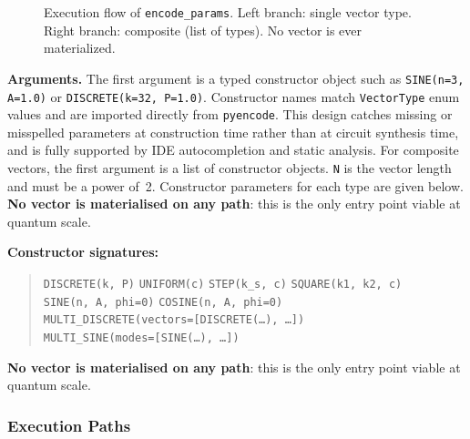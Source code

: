 \documentclass[10pt,twocolumn]{article}
\begin{document}
\begin{figure}[ht]
\caption{Execution flow of \texttt{encode\_params}.
         Left branch: single vector type.
         Right branch: composite (list of types).
         No vector is ever materialized.}
\label{fig:encode_params_flow}
\end{figure}

\noindent\textbf{Arguments.}
The first argument is a typed constructor object such
as \texttt{SINE(n=3, A=1.0)} or
\texttt{DISCRETE(k=32, P=1.0)}. Constructor names
match \texttt{VectorType} enum values and are imported
directly from \texttt{pyencode}. This design catches
missing or misspelled parameters at construction time
rather than at circuit synthesis time, and is fully
supported by IDE autocompletion and static analysis.
For composite vectors, the first argument is a list
of constructor objects. \texttt{N} is the vector
length and must be a power of~2. Constructor parameters for each type are given
below. \textbf{No vector is
materialised on any path}: this is the only entry
point viable at quantum scale.

\noindent\textbf{Constructor signatures:}
\begin{quote}\small
\texttt{DISCRETE(k, P)} \quad
\texttt{UNIFORM(c)} \quad
\texttt{STEP(k\_s, c)} \quad
\texttt{SQUARE(k1, k2, c)}\\[2pt]
\texttt{SINE(n, A, phi=0)} \quad
\texttt{COSINE(n, A, phi=0)}\\[2pt]
\texttt{MULTI\_DISCRETE(vectors=[DISCRETE(\ldots), \ldots])}\\[2pt]
\texttt{MULTI\_SINE(modes=[SINE(\ldots), \ldots])}
\end{quote}
\textbf{No vector is materialised on any path}: this is the only entry
point viable at quantum scale.

\subsubsection*{Execution Paths}
\end{document}

